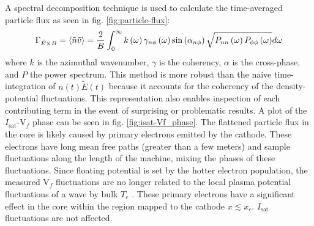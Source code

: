 A spectral decomposition technique is used to calculate the time-averaged particle flux \cite{Powers_1974} as seen in fig. \ref{fig:particle-flux}:
\begin{equation}
    \Gamma_{\tilde{E} \times B} = \langle \Tilde{n} \Tilde{v} \rangle = \frac{2}{B} \int^\infty_0 k \left( \omega \right) \gamma_{n \phi} \left( \omega \right) \sin \left( \alpha_{n \phi} \right) \sqrt{ P_{nn} \left( \omega \right) P_{\phi \phi} \left( \omega \right) } d\omega
    \label{eq:flux}
\end{equation}
where $k$ is the azimuthal wavenumber, $\gamma$ is the coherency, $\alpha$ is the cross-phase, and $P$ the power spectrum. This method is more robust than the naive time-integration of $n \left(t \right) \tilde{E} \left( t \right)$ because it accounts for the coherency of the density-potential fluctuations. This representation also enables inspection of each contributing term in the event of surprising or problematic results. A plot of the $I_\text{sat}$-V$_f$ phase can be seen in fig. \ref{fig:isat-Vf_phase}. The flattened particle flux in the core is likely caused by primary electrons emitted by the cathode. These electrons have long mean free paths (greater than a few meters) and sample fluctuations along the length of the machine, mixing the phases of these fluctuations. Since floating potential is set by the hotter electron population, the measured V$_f$ fluctuations are no longer related to the local plasma potential fluctuations of a wave by bulk $T_e$ \cite{Carter_2009}. These primary electrons have a significant effect in the core within the region mapped to the cathode $x \lesssim x_c$. $I_\text{sat}$ fluctuations are not affected.

